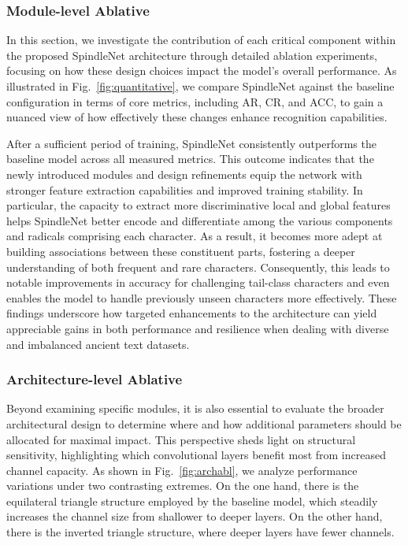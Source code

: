 \subsubsection{Module-level Ablative}


In this section, we investigate the contribution of each critical component within the proposed SpindleNet architecture through detailed ablation experiments, focusing on how these design choices impact the model’s overall performance. As illustrated in Fig.~\ref{fig:quantitative}, we compare SpindleNet against the baseline configuration in terms of core metrics, including AR, CR, and ACC, to gain a nuanced view of how effectively these changes enhance recognition capabilities.

After a sufficient period of training, SpindleNet consistently outperforms the baseline model across all measured metrics. This outcome indicates that the newly introduced modules and design refinements equip the network with stronger feature extraction capabilities and improved training stability. In particular, the capacity to extract more discriminative local and global features helps SpindleNet better encode and differentiate among the various components and radicals comprising each character. As a result, it becomes more adept at building associations between these constituent parts, fostering a deeper understanding of both frequent and rare characters. Consequently, this leads to notable improvements in accuracy for challenging tail-class characters and even enables the model to handle previously unseen characters more effectively. These findings underscore how targeted enhancements to the architecture can yield appreciable gains in both performance and resilience when dealing with diverse and imbalanced ancient text datasets.

\subsubsection{Architecture-level Ablative}


Beyond examining specific modules, it is also essential to evaluate the broader architectural design to determine where and how additional parameters should be allocated for maximal impact. This perspective sheds light on structural sensitivity, highlighting which convolutional layers benefit most from increased channel capacity. As shown in Fig.~\ref{fig:archabl}, we analyze performance variations under two contrasting extremes. On the one hand, there is the equilateral triangle structure employed by the baseline model, which steadily increases the channel size from shallower to deeper layers. On the other hand, there is the inverted triangle structure, where deeper layers have fewer channels.

